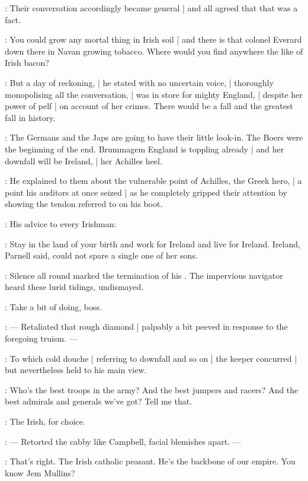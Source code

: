 :
Their conversation accordingly became general |
and all agreed that that was a fact.

\SkinTheGoat:
You could grow any mortal thing in Irish soil |
and there is that colonel Everard down there in Navan growing tobacco.
Where would you find anywhere the like of Irish bacon?

:
But a day of reckoning, |
he stated  with no uncertain voice, |
thoroughly monopolising all the conversation, |
was in store for mighty England, |
despite her power of pelf |
on account of her crimes.
There would be a fall and the greatest fall in history.

\SkinTheGoat:
The Germans and the Japs are going to have their little look-in.
The Boers were the beginning of the end.
Brummagem England is toppling already |
and her downfall will be Ireland, |
her Achilles heel.

:
He explained to them
about the vulnerable point of Achilles, the Greek hero, |
a point his auditors at once seized |
as he completely gripped their attention
by showing the tendon referred to on his boot.

:
His advice to every Irishman:

\SkinTheGoat:
Stay in the land of your birth and work for Ireland and live for Ireland.
Ireland, Parnell said, could not spare a single one of her sons.

:
Silence all round marked the termination of his .
The impervious navigator heard these lurid tidings, undismayed.

\Murphy:
Take a bit of doing, boss.

:
    --- Retaliated that rough diamond |
        palpably a bit peeved in response to the foregoing truism. ---

:
To which cold douche |
referring to downfall and so on |
the keeper concurred |
but nevertheless held to his main view.

\SkinTheGoat:
Who's the best troops in the army?
And the best jumpers and racers?
And the best admirals and generals we've got?
Tell me that.

\Campbell:
The Irish, for choice.

:
    --- Retorted the cabby like Campbell, facial blemishes apart. ---

\Murphy:
That's right.
The Irish catholic peasant.
He's the backbone of our empire.
You know Jem Mullins?

